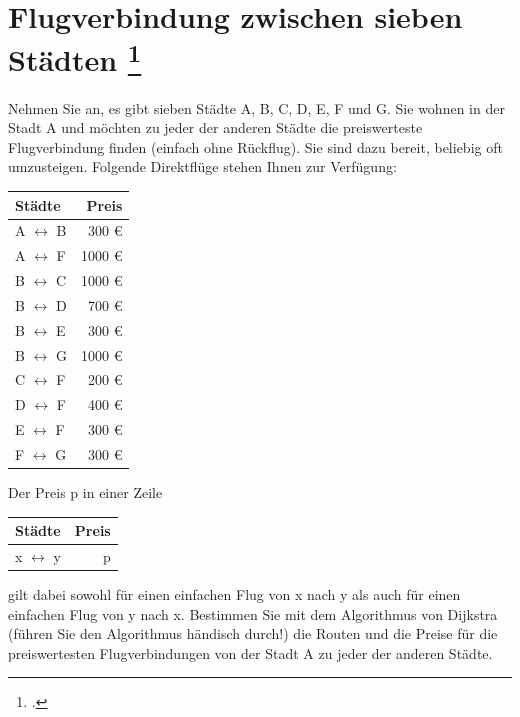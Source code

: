 \documentclass{lehramt-informatik-haupt}
\begin{document}
%

\section{Flugverbindung zwischen sieben Städten
\footcite[Seite 1, Aufgabe 1: Dijkstra]{aud:ab:6}}

Nehmen Sie an, es gibt sieben Städte A, B, C, D, E, F und G. Sie wohnen
in der Stadt A und möchten zu jeder der anderen Städte die preiswerteste
Flugverbindung finden (einfach ohne Rückflug). Sie sind dazu bereit,
beliebig oft umzusteigen. Folgende Direktflüge stehen Ihnen zur
Verfügung:

\begin{center}
\begin{tabular}{l|r}
Städte & Preis \\\hline
A $\leftrightarrow$ B & 300 € \\
A $\leftrightarrow$ F & 1000 € \\
B $\leftrightarrow$ C & 1000 € \\
B $\leftrightarrow$ D & 700 € \\
B $\leftrightarrow$ E & 300 € \\
B $\leftrightarrow$ G & 1000 € \\
C $\leftrightarrow$ F & 200 € \\
D $\leftrightarrow$ F & 400 € \\
E $\leftrightarrow$ F & 300 € \\
F $\leftrightarrow$ G & 300 € \\
\end{tabular}
\end{center}

\noindent
Der Preis p in einer Zeile

\begin{center}
\begin{tabular}{l|r}
Städte & Preis \\\hline
x $\leftrightarrow$ y & p \\
\end{tabular}
\end{center}

\noindent
gilt dabei sowohl für einen einfachen Flug von x nach y als auch für
einen einfachen Flug von y nach x. Bestimmen Sie mit dem Algorithmus von
Dijkstra (führen Sie den Algorithmus händisch durch!) die Routen und die
Preise für die preiswertesten Flugverbindungen von der Stadt A zu jeder
der anderen Städte.
\end{document}
